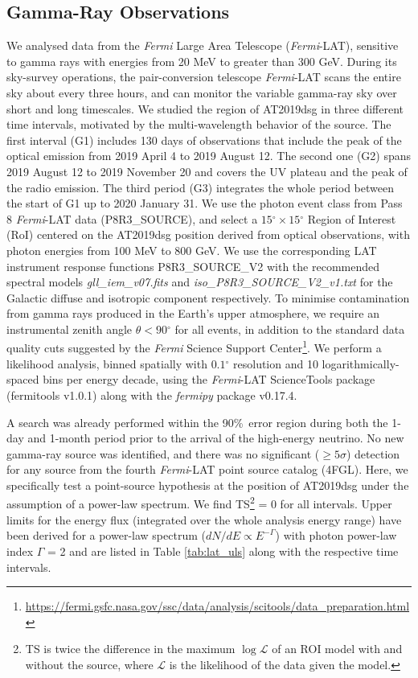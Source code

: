 \documentclass{nature_plusfigure}
\newcommand{\arcdeg}{\mbox{$^\circ$}}
\begin{document}
\begin{methods}
\section{Gamma-Ray Observations}
We analysed data from the %
\textit{Fermi} Large Area Telescope (\textit{Fermi}-LAT)\cite{2009ApJ...697.1071A}, sensitive to gamma rays with energies from 20 MeV to greater than 300 GeV. During its sky-survey operations, the pair-conversion telescope \textit{Fermi}-LAT scans the entire sky about every three hours, and can monitor the variable gamma-ray sky over short and long timescales. We studied the region of AT2019dsg in three different time intervals, motivated by the multi-wavelength behavior of the source. The first interval (G1) includes 130 days of observations that include the peak of the optical emission from 2019 April 4 to 2019 August 12. The second one (G2) spans 2019 August 12 to 2019 November 20 and covers the UV plateau and the peak of the radio emission. The third period (G3) integrates the whole period between the start of G1 up to 2020 January 31. We use the photon event class from Pass 8 \textit{Fermi}-LAT data (P8R3\_SOURCE), and select a $15\arcdeg \times 15\arcdeg$ Region of Interest (RoI) centered on the AT2019dsg position derived from optical observations, with photon energies from 100 MeV to 800 GeV. We use the corresponding LAT instrument response functions P8R3\_SOURCE\_V2 with the recommended spectral models \textit{gll\_iem\_v07.fits} and \textit{iso\_P8R3\_SOURCE\_V2\_v1.txt} for the Galactic diffuse and isotropic component respectively. To minimise contamination from gamma rays produced in the Earth's upper atmosphere, we require an instrumental zenith angle $\theta<90\arcdeg$ for all events, in addition to the standard data quality cuts suggested by the {\it Fermi} Science Support Center\footnote{\url{https://fermi.gsfc.nasa.gov/ssc/data/analysis/scitools/data_preparation.html}}. We perform a likelihood analysis, binned spatially with $0.1 \arcdeg$ resolution and 10 logarithmically-spaced bins per energy decade, using the \textit{Fermi}-LAT ScienceTools package (fermitools v1.0.1) along with the \textit{fermipy} package v0.17.4\cite{2017ICRC...35..824W}.

A search was already performed within the 90\%\ error region during both the 1-day and 1-month period prior to the arrival of the high-energy neutrino\cite{garrappa_buson:gcn25932}. No new gamma-ray source was identified, and there was no significant ($\geq 5 \sigma$) detection for any source from the fourth \textit{Fermi}-LAT point source catalog (4FGL\cite{2019arXiv190210045T}). Here, we specifically test a point-source hypothesis at the position of AT2019dsg under the assumption of a power-law spectrum. We find TS\footnote{TS is twice the difference in the maximum $\log \mathcal{L}$ of an ROI model with and without the source, where $\mathcal{L}$ is the likelihood of the data given the model.} = 0 for all intervals. Upper limits for the energy flux (integrated over the whole analysis energy range) have been derived for a power-law spectrum ($dN/dE \propto E^{-\Gamma}$) with photon power-law index $\Gamma$ = 2 and are listed in Table \ref{tab:lat_uls} along with the respective time intervals.


\end{methods}
\end{document}
